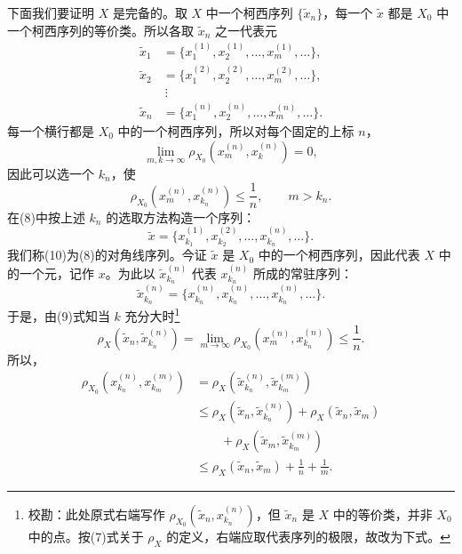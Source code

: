 下面我们要证明 $X$ 是完备的。取 $X$ 中一个柯西序列 $\{\widetilde x_n\}$，每一个 $\widetilde x$ 都是 $X_0$ 中一个柯西序列的等价类。所以各取 $\widetilde x_n$ 之一代表元
\begin{equation}
 \begin{aligned}
  \widetilde x_1&=\{x_1^{(1)},x_2^{(1)},\ldots,x_m^{(1)},\ldots\},\\
  \widetilde x_2&=\{x_1^{(2)},x_2^{(2)},\ldots,x_m^{(2)},\ldots\},\\
  &\ \vdots\\
  \widetilde x_n&=\{x_1^{(n)},x_2^{(n)},\ldots,x_m^{(n)},\ldots\}.
 \end{aligned}
 \tag{8}
\end{equation}
每一个横行都是 $X_0$ 中的一个柯西序列，所以对每个固定的上标 $n$，
\[
 \lim_{m,k\to\infty}\rho_{X_0}(x_m^{(n)},x_k^{(n)})=0,
\]
因此可以选一个 $k_n$，使
\begin{equation}
 \rho_{X_0}(x_m^{(n)},x_{k_n}^{(n)})\le\frac1n,\qquad m>k_n.
 \tag{9}
\end{equation}
在(8)中按上述 $k_n$ 的选取方法构造一个序列：
\begin{equation}
 \widetilde x=\{x_{k_1}^{(1)},x_{k_2}^{(2)},\ldots,x_{k_n}^{(n)},\ldots\}.
 \tag{10}
\end{equation}
我们称(10)为(8)的对角线序列。今证 $\widetilde x$ 是 $X_0$ 中的一个柯西序列，因此代表 $X$ 中的一个元，记作 $x$。为此以 $\widetilde x_{k_n}^{(n)}$ 代表 $x_{k_n}^{(n)}$ 所成的常驻序列：
\[
 \widetilde x_{k_n}^{(n)}=\{x_{k_n}^{(n)},x_{k_n}^{(n)},\ldots,x_{k_n}^{(n)},\ldots\}.
\]
于是，由(9)式知当 $k$ 充分大时\footnote{校勘：此处原式右端写作 $\rho_{X_0}(\widetilde x_n,x_{k_n}^{(n)})$，但 $\widetilde x_n$ 是 $X$ 中的等价类，并非 $X_0$ 中的点。按(7)式关于 $\rho_X$ 的定义，右端应取代表序列的极限，故改为下式。}
\begin{equation}
 \rho_X(\widetilde x_n,\widetilde x_{k_n}^{(n)})
 =\lim_{m\to\infty}\rho_{X_0}(x_m^{(n)},x_{k_n}^{(n)})\le\frac1n.
 \tag{11}
\end{equation}
所以，
\[
\begin{aligned}
 \rho_{X_0}(x_{k_n}^{(n)},x_{k_m}^{(m)})
 &=\rho_X(\widetilde x_{k_n}^{(n)},\widetilde x_{k_m}^{(m)})\\
 &\le\rho_X(\widetilde x_n,\widetilde x_{k_n}^{(n)})
 +\rho_X(\widetilde x_n,\widetilde x_m)\\
 &\qquad+\rho_X(\widetilde x_m,\widetilde x_{k_m}^{(m)})\\
 &\le\rho_X(\widetilde x_n,\widetilde x_m)+\frac1n+\frac1m.
\end{aligned}
\]
